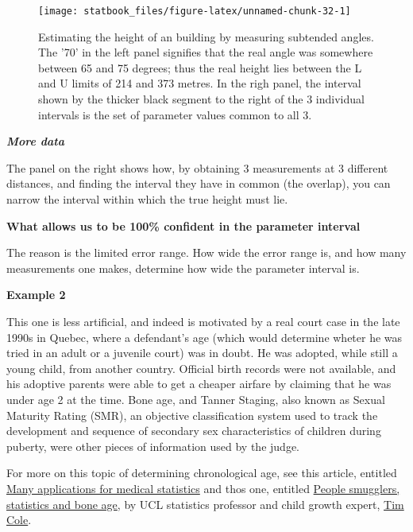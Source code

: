 \documentclass[]{book}
\begin{document}
\begin{figure}

{\centering \texttt{[image: statbook\_files/figure-latex/unnamed-chunk-32-1]} 

}

\caption{Estimating the height of an building by measuring subtended angles. The '70' in the left panel signifies that the real angle was somewhere between 65 and 75 degrees; thus the real height lies between the L and U limits of 214 and 373 metres. In the righ panel, the  interval shown by the thicker black segment to the right of the 3 individual intervals is the  set of parameter values common to all 3.}\label{fig:unnamed-chunk-32}
\end{figure}

\textbf{\emph{More data}}

The panel on the right shows how, by obtaining 3 measurements at 3 different distances, and finding the interval they have in common (the overlap), you can narrow the interval within which the true height must lie.

\textbf{What allows us to be 100\% confident in the parameter interval}

The reason is the limited error range. How wide the error range is, and how many measurements one makes, determine how wide the parameter interval is.

\textbf{Example 2}

This one is less artificial, and indeed is motivated by a real court case in the late 1990s in Quebec, where a defendant's age (which would determine wheter he was tried in an adult or a juvenile court) was in doubt. He was adopted, while still a young child, from another country. Official birth records were not available, and his adoptive parents were able to get a cheaper airfare by claiming that he was under age 2 at the time. Bone age, and Tanner Staging, also known as Sexual Maturity Rating (SMR), an objective classification system used to track the development and sequence of secondary sex characteristics of children during puberty, were other pieces of information used by the judge.

For more on this topic of determining chronological age, see this article, entitled \href{https://discovery.ucl.ac.uk/id/eprint/1470308/1/Tim_Cole_Intl_Innovation_140_Research_Media.pdf}{Many applications for medical statistics} and thos one, entitled \href{https://rss.onlinelibrary.wiley.com/doi/full/10.1111/j.1740-9713.2012.00568.x}{People smugglers, statistics and bone age}, by UCL statistics professor and child growth expert, \href{https://scholar.google.com/citations?user=1P_yQocAAAAJ\&hl=en}{Tim Cole}.
\end{document}
